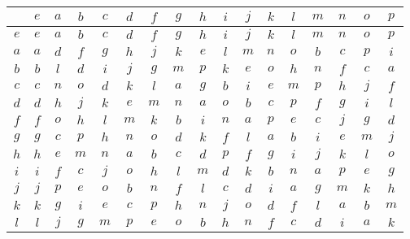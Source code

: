 \documentclass[12pt]{amsart}
\begin{document}
\begin{center}\begin{tabular}{c|cccccccccccccccc}
	&\(e\) &\(a\) &\(b\) &\(c\) &\(d\) &\(f\) &\(g\) &\(h\) &\(i\) &\(j\) &\(k\) &\(l\) &\(m\) &\(n\) &\(o\) &\(p\) \\\hline
	\(e\)  & \(e\)  & \(a\)  & \(b\)  & \(c\)  & \(d\)  & \(f\)  & \(g\)  & \(h\)  & \(i\)  & \(j\)  & \(k\)  & \(l\)  & \(m\)  & \(n\)  & \(o\)  & \(p\)  \\
	\(a\)  & \(a\)  & \(d\)  & \(f\)  & \(g\)  & \(h\)  & \(j\)  & \(k\)  & \(e\)  & \(l\)  & \(m\)  & \(n\)  & \(o\)  & \(b\)  & \(c\)  & \(p\)  & \(i\)  \\
	\(b\)  & \(b\)  & \(l\)  & \(d\)  & \(i\)  & \(j\)  & \(g\)  & \(m\)  & \(p\)  & \(k\)  & \(e\)  & \(o\)  & \(h\)  & \(n\)  & \(f\)  & \(c\)  & \(a\)  \\
	\(c\)  & \(c\)  & \(n\)  & \(o\)  & \(d\)  & \(k\)  & \(l\)  & \(a\)  & \(g\)  & \(b\)  & \(i\)  & \(e\)  & \(m\)  & \(p\)  & \(h\)  & \(j\)  & \(f\)  \\
	\(d\)  & \(d\)  & \(h\)  & \(j\)  & \(k\)  & \(e\)  & \(m\)  & \(n\)  & \(a\)  & \(o\)  & \(b\)  & \(c\)  & \(p\)  & \(f\)  & \(g\)  & \(i\)  & \(l\)  \\
	\(f\)  & \(f\)  & \(o\)  & \(h\)  & \(l\)  & \(m\)  & \(k\)  & \(b\)  & \(i\)  & \(n\)  & \(a\)  & \(p\)  & \(e\)  & \(c\)  & \(j\)  & \(g\)  & \(d\)  \\
	\(g\)  & \(g\)  & \(c\)  & \(p\)  & \(h\)  & \(n\)  & \(o\)  & \(d\)  & \(k\)  & \(f\)  & \(l\)  & \(a\)  & \(b\)  & \(i\)  & \(e\)  & \(m\)  & \(j\)  \\
	\(h\)  & \(h\)  & \(e\)  & \(m\)  & \(n\)  & \(a\)  & \(b\)  & \(c\)  & \(d\)  & \(p\)  & \(f\)  & \(g\)  & \(i\)  & \(j\)  & \(k\)  & \(l\)  & \(o\)  \\
	\(i\)  & \(i\)  & \(f\)  & \(c\)  & \(j\)  & \(o\)  & \(h\)  & \(l\)  & \(m\)  & \(d\)  & \(k\)  & \(b\)  & \(n\)  & \(a\)  & \(p\)  & \(e\)  & \(g\)  \\
	\(j\)  & \(j\)  & \(p\)  & \(e\)  & \(o\)  & \(b\)  & \(n\)  & \(f\)  & \(l\)  & \(c\)  & \(d\)  & \(i\)  & \(a\)  & \(g\)  & \(m\)  & \(k\)  & \(h\)  \\
	\(k\)  & \(k\)  & \(g\)  & \(i\)  & \(e\)  & \(c\)  & \(p\)  & \(h\)  & \(n\)  & \(j\)  & \(o\)  & \(d\)  & \(f\)  & \(l\)  & \(a\)  & \(b\)  & \(m\)  \\
	\(l\)  & \(l\)  & \(j\)  & \(g\)  & \(m\)  & \(p\)  & \(e\)  & \(o\)  & \(b\)  & \(h\)  & \(n\)  & \(f\)  & \(c\)  & \(d\)  & \(i\)  & \(a\)  & \(k\)  \\

\end{tabular}
\end{center}
\end{document}

